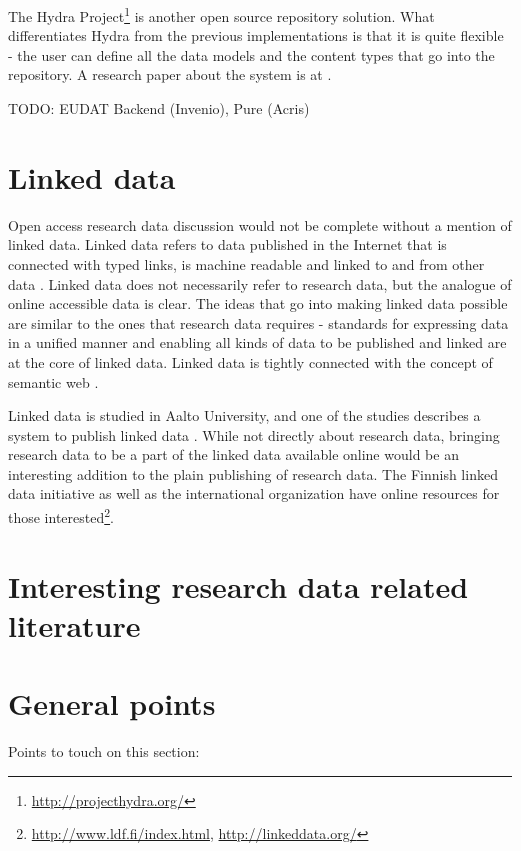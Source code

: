 The Hydra Project\footnote{\url{http://projecthydra.org/}} is another open
source repository solution. What differentiates Hydra from the previous
implementations is that it is quite flexible - the user can define all the data
models and the content types that go into the repository. A research paper
about the system is at \cite{awre2009project}.

TODO: EUDAT Backend (Invenio), Pure (Acris)

\section{Linked data}

Open access research data discussion would not be complete without a mention
of linked data. Linked data refers to data published in the Internet that is connected
with typed links, is machine readable and linked to and from other data
\cite{DBLP:journals/ijswis/BizerHB09}. Linked data does not necessarily refer
to research data, but the analogue of online accessible data is clear. The
ideas that go into making linked data possible are similar to the ones that
research data requires - standards for expressing data in a unified manner and
enabling all kinds of data to be published and linked are at the core of linked
data. Linked data is tightly connected with the concept of semantic web
\cite{berners2001semantic}.

Linked data is studied in Aalto University, and one of the studies describes
a system to publish linked data \cite{DBLP:conf/esws/FrosterusHL11}. While not
directly about research data, bringing research data to be a part of the linked
data available online would be an interesting addition to the plain publishing
of research data. The Finnish linked data initiative as well as the
international organization have online resources for those interested\footnote{
\url{http://www.ldf.fi/index.html}, \url{http://linkeddata.org/}}.

\iffalse

\section{Interesting research data related literature}

\section{General points}

Points to touch on this section:

